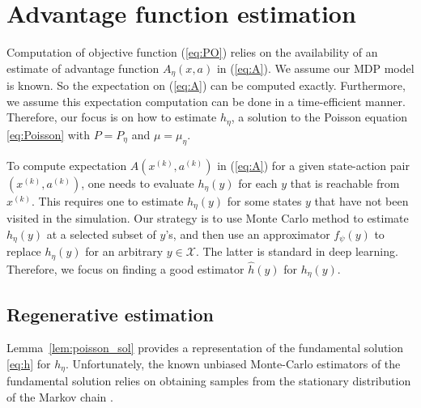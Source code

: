 \documentclass[11pt]{article}
\newcommand{\X}{\mathcal{X}}
\theoremstyle{definition}
\numberwithin{equation}{section}
\begin{document}
\section{Advantage function estimation}\label{sec:M1}


Computation of objective function (\ref{eq:PO}) relies on the availability of  an estimate of  advantage function
$A_{\eta} (x, a)$ in (\ref{eq:A}).  We assume our MDP model is
known. So the expectation on (\ref{eq:A}) can be computed
exactly. Furthermore, we assume this expectation computation can be
done in a time-efficient manner. Therefore, our focus is on how to
estimate $h_\eta$, a solution to the Poisson equation
\eqref{eq:Poisson} with $P=P_\eta$ and
$\mu=\mu_\eta$.



To compute expectation $A\left(x^{(k)}, a^{(k)}\right)$ in (\ref{eq:A}) for a given
state-action pair $\left(x^{(k)},a^{(k)}\right)$, one needs to evaluate $h_\eta(y)$ for each $y$ that
is reachable from $x^{(k)}$. This requires one to estimate
$h_\eta(y)$ for some states $y$ that have not been visited in the simulation. Our strategy is to
use Monte Carlo method to estimate $h_\eta(y)$ at a  selected
subset of $y$'s, and then use an approximator $f_\psi(y)$ to
replace $h_\eta(y)$ for an arbitrary $y\in \X$. The latter is standard
in deep learning. Therefore, we focus on finding a good estimator
$
  \hat h(y)
$
for $h_\eta(y)$.







\subsection{Regenerative estimation}

 Lemma~\ref{lem:poisson_sol} provides a representation of the fundamental solution
\eqref{eq:h} for $h_\eta$. Unfortunately, the known unbiased Monte-Carlo estimators of the fundamental solution relies on obtaining  samples from the stationary distribution of the Markov chain \cite[Section 5.1]{Cooper2003}.
\end{document}
